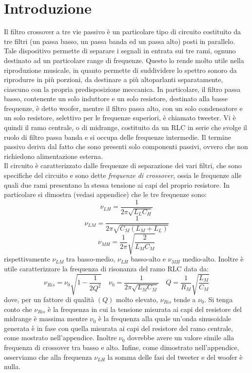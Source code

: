 \documentclass[]{article}
\begin{document}
\section{Introduzione}
Il filtro crossover a tre vie passivo è un particolare tipo di circuito costituito da tre filtri (un passa basso, un passa banda ed un passa alto) posti in parallelo. Tale dispositivo permette di separare i segnali in entrata sui tre rami, ognuno destinato ad un particolare range di frequenze. Questo lo rende molto utile nella riproduzione musicale, in quanto permette di suddividere lo spettro sonoro da riprodurre in più porzioni, da destinare a più altoparlanti separatamente, ciascuno con la propria predisposizione meccanica. In particolare, il filtro passa basso, contenente un solo induttore e un solo resistore, destinato alla basse frequenze, è detto woofer, mentre il filtro passa alto, con un solo condensatore e un solo resistore,  selettivo per le frequenze superiori, è chiamato tweeter. Vi è quindi il ramo centrale, o di midrange, costituito da un RLC in serie che svolge il ruolo di filtro passa banda e si occupa delle frequenze intermedie. Il termine passivo deriva dal fatto che sono presenti solo componenti passivi, ovvero che non richiedono alimentazione esterna.\\
Il circuito è caratterizzato dalle frequenze di separazione dei vari filtri, che sono specifiche del circuito e sono dette \textit{frequenze di crossover}, ossia le frequenze alle quali due rami presentano la stessa tensione ai capi del proprio resistore. In particolare si dimostra (vedasi appendice) che le tre frequenze sono: 
\begin{equation}\label{crossoverLH}
 \nu_{LH}=\frac{1}{2\pi\sqrt{L_{L}C_{H}}}
\end{equation}
\begin{equation}\label{crossoverLM}
\nu_{LM}=\frac{1}{2\pi\sqrt{C_{M}(L_{M}+L_{L})}}
\end{equation}
\begin{equation}\label{crossoverMH}
	\nu_{MH}=\frac{1}{2\pi}\sqrt{\frac{2}{L_{M}C_{M}}}
\end{equation}
rispettivamente  $\nu_{LM}$ tra basso-medio,  $\nu_{LH}$ basso-alto e  $\nu_{MH}$ medio-alto. Inoltre è utile caratterizzare la frequenza di risonanza del ramo RLC data da:
\begin{equation}
  \nu_{Ris}=\nu_0 \sqrt{1-\frac{1}{2Q^2}} \quad  \nu_{0}=\frac{1}{2\pi\sqrt{L_M C_M}} \quad Q=\frac{1}{R_M}\sqrt{\frac{L_M}{C_M}}
\end{equation}
dove, per un fattore di qualità $(Q)$ molto elevato, $\nu_{Ris}$ tende a $\nu_{0}$. Si tenga conto che $\nu_{Ris}$ è la frequenza in cui la tensione misurata ai capi del resistore del midrange è massima mentre $\nu_{0}$ è la frequenza alla quale un'onda sinusoidale generata è in fase con quella misurata ai capi del resistore del ramo centrale, come mostrato nell'appendice. 
Inoltre $\nu_{0}$ dovrebbe avere un valore simile alla frequenza di crossover tra basso e alto.
Infine, come dimostrato nell'appendice, osserviamo che alla frequenza $\nu_{LH}$ la somma delle fasi del tweeter e del woofer è nulla.
\end{document}

